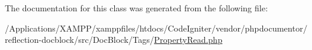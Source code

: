 The documentation for this class was generated from the following file\+:\begin{DoxyCompactItemize}
\item 
/\+Applications/\+X\+A\+M\+P\+P/xamppfiles/htdocs/\+Code\+Igniter/vendor/phpdocumentor/reflection-\/docblock/src/\+Doc\+Block/\+Tags/\mbox{\hyperlink{_property_read_8php}{Property\+Read.\+php}}\end{DoxyCompactItemize}
